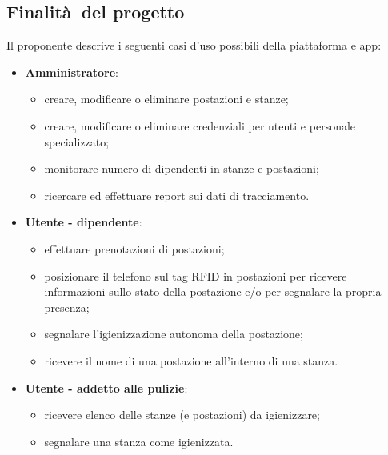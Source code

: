 \subsection{Finalità del progetto}
Il proponente descrive i seguenti casi d'uso possibili della piattaforma e app:
\begin{itemize}
    \item \textbf{Amministratore}:
    \begin{itemize}
        \item creare, modificare o eliminare postazioni e stanze;
        \item creare, modificare o eliminare credenziali per utenti e personale specializzato;
        \item monitorare numero di dipendenti in stanze e postazioni;
        \item ricercare ed effettuare report sui dati di tracciamento.
    \end{itemize}
    \item \textbf{Utente - dipendente}:
    \begin{itemize}
        \item effettuare prenotazioni di postazioni;
        \item posizionare il telefono sul tag RFID in postazioni per ricevere informazioni sullo stato della postazione e/o per segnalare la propria presenza;
        \item segnalare l'igienizzazione autonoma della postazione;
        \item ricevere il nome di una postazione all'interno di una stanza.
    \end{itemize}
    \item \textbf{Utente - addetto alle pulizie}:
    \begin{itemize}
        \item ricevere elenco delle stanze (e postazioni) da igienizzare;
        \item segnalare una stanza come igienizzata.
    \end{itemize}
\end{itemize}
